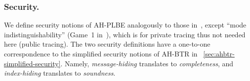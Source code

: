 \subsubsection{Security.}
We define security notions of AH-PLBE analogously to those in~\cite{EC:BonSahWat06}, except ``mode indistinguishability'' (Game~1 in~\cite{EC:BonSahWat06}),
which is for private tracing thus not needed here (public tracing).
The two security definitions have a one-to-one correspondence to the simplified security notions of AH-BTR in \Section~\ref{sec:ahbtr-simplified-security}.
Namely, \emph{message-hiding} translates to \emph{completeness}, and
\emph{index-hiding} translates to \emph{soundness}.
